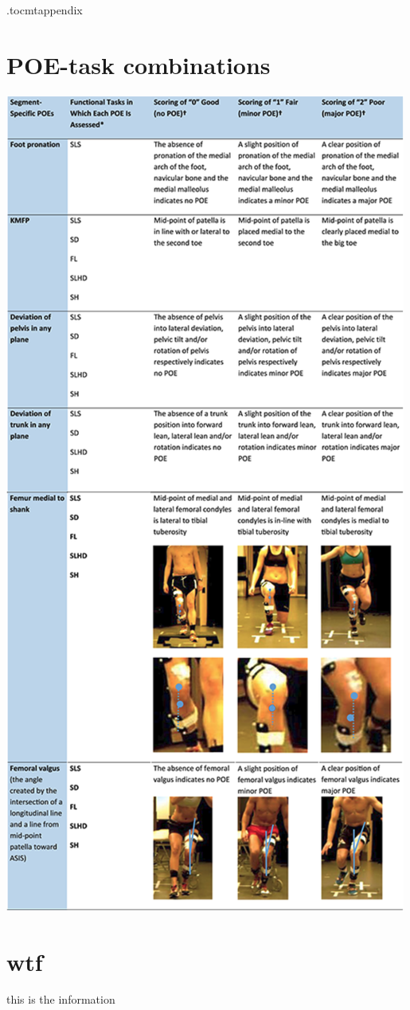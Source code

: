 \newpage
\appendix
\newpage
\etocdepthtag.toc{mtappendix}
\tableofcontents
\newpage


\chapter[POE-task combinations]{POE-task combinations \cite{Nae2020b}} \label{app:poe-task}
  \centering
  \includegraphics[trim=0 60 0 0, clip, height=0.95\textheight]{files/figs/poes-detailed-rot.png}


\chapter{wtf}
this is the information

